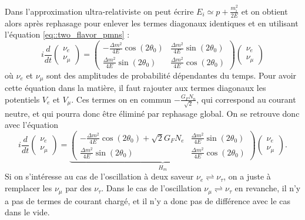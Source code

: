             Dans l'approximation ultra-relativiste on peut écrire $E_i \simeq p+ \frac{m_i^2}{2E}$ et on obtient alors après rephasage pour enlever les termes diagonaux identiques et en utilisant l'équation \eqref{eq::two_flavor_pmns} :
            \begin{equation}
                i\frac{d}{dt}\left(\begin{matrix}\nu_e \\ \nu_{\mu}\end{matrix}\right) = \left(\begin{matrix}-\frac{\Delta m^2}{4E}\cos(2\theta_0) & \frac{\Delta m^2}{4E}\sin(2\theta_0) \\ \frac{\Delta m^2}{4E}\sin(2\theta_0) & \frac{\Delta m^2}{4E}\cos(2\theta_0)\end{matrix}\right)\left(\begin{matrix}\nu_e \\ \nu_{\mu}\end{matrix}\right)
            \end{equation}
            où $\nu_e$ et $\nu_{\mu}$ sont des amplitudes de probabilité dépendantes du temps. Pour avoir cette équation dans la matière, il faut rajouter aux termes diagonaux les potentiels $V_e$ et $V_{\mu}$. Ces termes on en commun $-\frac{G_F N_n}{\sqrt{2}}$, qui correspond au courant neutre, et qui pourra donc être éliminé par rephasage global. On se retrouve donc avec l'équation
            \begin{equation}\label{eq::hamiltonian_matter_2flavor}
                i\frac{d}{dt}\left(\begin{matrix}\nu_e \\ \nu_{\mu}\end{matrix}\right) = \underbrace{\left(\begin{matrix}-\frac{\Delta m^2}{4E}\cos(2\theta_0)+\sqrt{2}G_F N_e & \frac{\Delta m^2}{4E}\sin(2\theta_0) \\ \frac{\Delta m^2}{4E}\sin(2\theta_0) & \frac{\Delta m^2}{4E}\cos(2\theta_0)\end{matrix}\right)}_{H_m}\left(\begin{matrix}\nu_e \\ \nu_{\mu}\end{matrix}\right).
            \end{equation}
            Si on s'intéresse au cas de l'oscillation à deux saveur $\nu_e\rightleftharpoons\nu_{\tau}$, on a juste à remplacer les $\nu_{\mu}$ par des $\nu_{\tau}$. Dans le cas de l'oscillation $\nu_{\mu}\rightleftharpoons\nu_{\tau}$ en revanche, il n'y a pas de termes de courant chargé, et il n'y a donc pas de différence avec le cas dans le vide.
            
